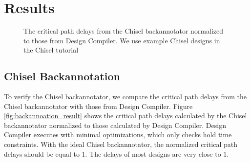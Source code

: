 \section{Results}
\begin{figure}
	\centering
    \caption{The critical path delays from the Chisel backannotator normalized to those from Design Compiler. We use example Chisel designs in the Chisel tutorial}
	\label{fig:backannotation_result}
\end{figure}
\subsection{Chisel Backannotation}
To verify the Chisel backannotator, we compare the critical path delays from the Chisel backannotator with those from Design Compiler. Figure \ref{fig:backannoation_result} shows the critical path delays calculated by the Chisel backannotator normalized to those calculated by Design Compiler. Design Compiler executes with minimal optimizations, which only checks hold time constraints. With the ideal Chisel backannotator, the normalized critical path delays should be equal to 1. The delays of most designs are very close to 1.

